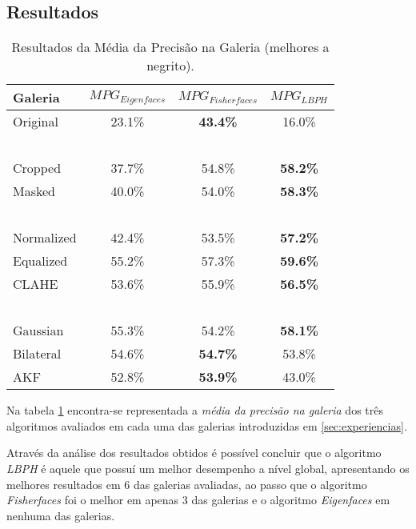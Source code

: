 \subsection{Resultados}

\begin{center}
\begin{table}
    \begin{center}
    \caption{Resultados da Média da Precisão na Galeria (melhores a negrito).}
    \begin{tabular}{l|ccc}
    Galeria    & $MPG_{Eigenfaces}$ & $MPG_{Fisherfaces}$ & $MPG_{LBPH}$ \\ 
    \hline\hline
    Original   & 23.1\%          & \textbf{43.4\%}  & 16.0\%             \\
    ~ \\
    Cropped    & 37.7\%          & 54.8\%           & \textbf{58.2\%}    \\
    Masked     & 40.0\%          & 54.0\%           & \textbf{58.3\%}    \\
    ~ \\
    Normalized & 42.4\%          & 53.5\%           & \textbf{57.2\%}    \\
    Equalized  & 55.2\%          & 57.3\%           & \textbf{59.6\%}    \\
    CLAHE      & 53.6\%          & 55.9\%           & \textbf{56.5\%}    \\
    ~ \\
    Gaussian   & 55.3\%          & 54.2\%           & \textbf{58.1\%}    \\
    Bilateral  & 54.6\%          & \textbf{54.7\%}           & 53.8\%    \\
    AKF        & 52.8\%          & \textbf{53.9\%}           & 43.0\%             \\
    \hline\hline
    \end{tabular}
    \label{tab:resultadosprecicao}
    \end{center}
\end{table}
\end{center}

Na tabela \ref{tab:resultadosprecicao} encontra-se representada a \textit{média da precisão na galeria} dos três algoritmos avaliados em cada uma das galerias introduzidas em \ref{sec:experiencias}. 

Através da análise dos resultados obtidos é possível concluir que o algoritmo \textit{LBPH} é aquele que possuí um melhor desempenho a nível global, apresentando os melhores resultados em 6 das galerias avaliadas, ao passo que o algoritmo \textit{Fisherfaces} foi o melhor em apenas 3 das galerias e o algoritmo \textit{Eigenfaces} em nenhuma das galerias.

